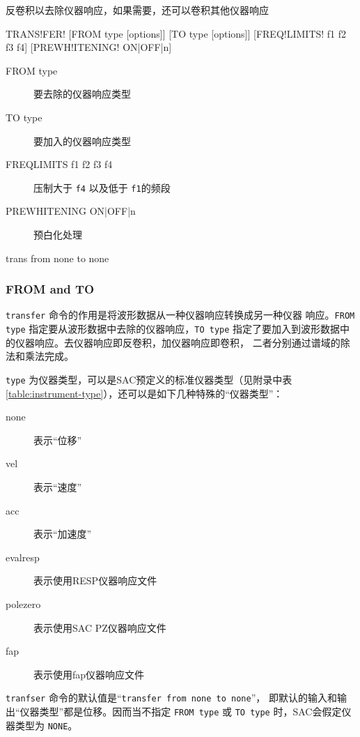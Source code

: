 \label{cmd:transfer}

反卷积以去除仪器响应，如果需要，还可以卷积其他仪器响应

\begin{SACSTX}
TRANS!FER! [FROM type [options]] [TO type [options]]
    [FREQ!LIMITS! f1 f2 f3 f4] [PREWH!ITENING! ON|OFF|n]
\end{SACSTX}

\begin{description}
\item [FROM type] 要去除的仪器响应类型
\item [TO type] 要加入的仪器响应类型
\item [FREQLIMITS f1 f2 f3 f4] 压制大于 \texttt{f4} 以及低于 \texttt{f1}的频段
\item [PREWHITENING ON|OFF|n] 预白化处理
\end{description}

\begin{SACDFT}
trans from none to none
\end{SACDFT}

\subsubsection{FROM and TO}
\texttt{transfer} 命令的作用是将波形数据从一种仪器响应转换成另一种仪器
响应。\texttt{FROM type} 指定要从波形数据中去除的仪器响应，\texttt{TO type}
指定了要加入到波形数据中的仪器响应。去仪器响应即反卷积，加仪器响应即卷积，
二者分别通过谱域的除法和乘法完成。

\texttt{type} 为仪器类型，可以是SAC预定义的标准仪器类型（见附录中表
\ref{table:instrument-type}），还可以是如下几种特殊的``仪器类型''：
\begin{description}
\item [none] 表示``位移''
\item [vel] 表示``速度''
\item [acc] 表示``加速度''
\item [evalresp] 表示使用RESP仪器响应文件
\item [polezero] 表示使用SAC PZ仪器响应文件
\item [fap] 表示使用fap仪器响应文件
\end{description}

\texttt{tranfser} 命令的默认值是``\texttt{transfer from none to none}''，
即默认的输入和输出``仪器类型''都是位移。因而当不指定 \texttt{FROM type}
或 \texttt{TO type} 时，SAC会假定仪器类型为 \texttt{NONE}。

